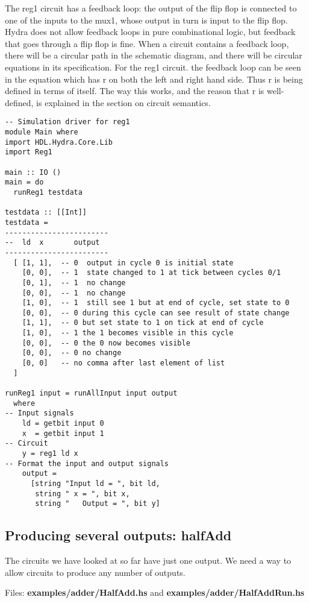 \documentclass[11pt]{article}
\begin{document}
The reg1 circuit has a feedback loop: the output of the flip flop is
connected to one of the inputs to the mux1, whose output in turn is
input to the flip flop.  Hydra does not allow feedback loops in pure
combinational logic, but feedback that goes through a flip flop is
fine.  When a circuit contains a feedback loop, there will be a
circular path in the schematic diagram, and there will be circular
equations in its specification.  For the reg1 circuit. the feedback
loop can be seen in the equation which has r on both the left and
right hand side.  Thus r is being defined in terms of itself.  The way
this works, and the reason that r is well-defined, is explained in the
section on circuit semantics.

\begin{verbatim}
-- Simulation driver for reg1
module Main where
import HDL.Hydra.Core.Lib
import Reg1

main :: IO ()
main = do
  runReg1 testdata

testdata :: [[Int]]
testdata =
------------------------
--  ld  x       output
------------------------
  [ [1, 1],  -- 0  output in cycle 0 is initial state
    [0, 0],  -- 1  state changed to 1 at tick between cycles 0/1
    [0, 1],  -- 1  no change
    [0, 0],  -- 1  no change
    [1, 0],  -- 1  still see 1 but at end of cycle, set state to 0
    [0, 0],  -- 0 during this cycle can see result of state change
    [1, 1],  -- 0 but set state to 1 on tick at end of cycle
    [1, 0],  -- 1 the 1 becomes visible in this cycle
    [0, 0],  -- 0 the 0 now becomes visible
    [0, 0],  -- 0 no change
    [0, 0]   -- no comma after last element of list
  ]

runReg1 input = runAllInput input output
  where
-- Input signals
    ld = getbit input 0
    x  = getbit input 1
-- Circuit
    y = reg1 ld x
-- Format the input and output signals
    output =
      [string "Input ld = ", bit ld,
       string " x = ", bit x,
       string "   Output = ", bit y]
\end{verbatim}

\subsection{Producing several outputs: halfAdd}
\label{sec:org5a57735}

The circuits we have looked at so far have just one output.  We need a
way to allow circuits to produce any number of outputs.

Files: \textbf{examples/adder/HalfAdd.hs} and \textbf{examples/adder/HalfAddRun.hs}
\end{document}
